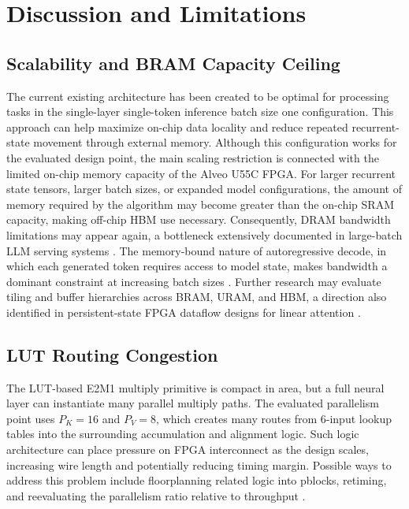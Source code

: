 ﻿\documentclass[conference]{IEEEtran}
\begin{document}
\section{Discussion and Limitations}

\subsection{Scalability and BRAM Capacity Ceiling}
The current existing architecture has been created to be optimal for processing tasks in the single-layer single-token inference batch size one configuration. This approach can help maximize on-chip data locality and reduce repeated recurrent-state movement through external memory. Although this configuration works for the evaluated design point, the main scaling restriction is connected with the limited on-chip memory capacity of the Alveo U55C FPGA. For larger recurrent state tensors, larger batch sizes, or expanded model configurations, the amount of memory required by the algorithm may become greater than the on-chip SRAM capacity, making off-chip HBM use necessary. Consequently, DRAM bandwidth limitations may appear again, a bottleneck extensively documented in large-batch LLM serving systems \cite{b1,b4,b7}. The memory-bound nature of autoregressive decode, in which each generated token requires access to model state, makes bandwidth a dominant constraint at increasing batch sizes \cite{b5}. Further research may evaluate tiling and buffer hierarchies across BRAM, URAM, and HBM, a direction also identified in persistent-state FPGA dataflow designs for linear attention \cite{b10}.

\subsection{LUT Routing Congestion}
The LUT-based E2M1 multiply primitive is compact in area, but a full neural layer can instantiate many parallel multiply paths. The evaluated parallelism point uses $P_K=16$ and $P_V=8$, which creates many routes from 6-input lookup tables into the surrounding accumulation and alignment logic. Such logic architecture can place pressure on FPGA interconnect as the design scales, increasing wire length and potentially reducing timing margin. Possible ways to address this problem include floorplanning related logic into pblocks, retiming, and reevaluating the parallelism ratio relative to throughput \cite{b10}.
\end{document}
